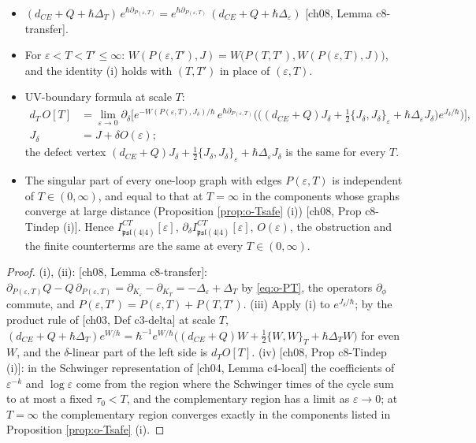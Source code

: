 \begin{lemma}
\label{lem:o-Tflow}
\begin{itemize}
\item[(i)] $(d_{CE}+Q+\hbar\Delta_T)\,e^{\hbar\partial_{P(\varepsilon,T)}}=e^{\hbar\partial_{P(\varepsilon,T)}}\,(d_{CE}+Q+\hbar\Delta_\varepsilon)$ [ch08, Lemma c8-transfer].
\item[(ii)] For $\varepsilon<T<T'\le\infty$: $W(P(\varepsilon,T'),J)=W\big(P(T,T'),W(P(\varepsilon,T),J)\big)$, and the identity (i) holds with $(T,T')$ in place of $(\varepsilon,T)$.
\item[(iii)] UV-boundary formula at scale $T$:
\[
\begin{aligned}
d_T\,O[T]&=\lim_{\varepsilon\to0}\partial_\delta\Big[e^{-W(P(\varepsilon,T),J_\delta)/\hbar}\,e^{\hbar\partial_{P(\varepsilon,T)}}\Big(\big((d_{CE}+Q)J_\delta+\tfrac12\{J_\delta,J_\delta\}_\varepsilon+\hbar\Delta_\varepsilon J_\delta\big)e^{J_\delta/\hbar}\Big)\Big],\\
J_\delta&=J+\delta O(\varepsilon);
\end{aligned}
\]
the defect vertex $(d_{CE}+Q)J_\delta+\tfrac12\{J_\delta,J_\delta\}_\varepsilon+\hbar\Delta_\varepsilon J_\delta$ is the same for every $T$.
\item[(iv)] The singular part of every one-loop graph with edges $P(\varepsilon,T)$ is independent of $T\in(0,\infty)$, and equal to that at $T=\infty$ in the components whose graphs converge at large distance (Proposition \ref{prop:o-Tsafe} (i)) [ch08, Prop c8-Tindep (i)]. Hence $I^{CT}_{\mathfrak{psl}(4|4)}[\varepsilon]$, $\partial_\delta I^{CT}_{\mathfrak{psl}(4|4)}[\varepsilon]$, $O(\varepsilon)$, the obstruction and the finite counterterms are the same at every $T\in(0,\infty)$.
\end{itemize}
\end{lemma}

\begin{proof}
(i), (ii): [ch08, Lemma c8-transfer]: $\partial_{P(\varepsilon,T)}Q-Q\,\partial_{P(\varepsilon,T)}=\partial_{K_\varepsilon}-\partial_{K_T}=-\Delta_\varepsilon+\Delta_T$ by \eqref{eq:o-PT}, the operators $\partial_\phi$ commute, and $P(\varepsilon,T')=P(\varepsilon,T)+P(T,T')$. (iii) Apply (i) to $e^{J_\delta/\hbar}$; by the product rule of [ch03, Def c3-delta] at scale $T$, $(d_{CE}+Q+\hbar\Delta_T)e^{W/\hbar}=\hbar^{-1}e^{W/\hbar}\big((d_{CE}+Q)W+\tfrac12\{W,W\}_T+\hbar\Delta_TW\big)$ for even $W$, and the $\delta$-linear part of the left side is $d_TO[T]$. (iv) [ch08, Prop c8-Tindep (i)]: in the Schwinger representation of [ch04, Lemma c4-local] the coefficients of $\varepsilon^{-k}$ and $\log\varepsilon$ come from the region where the Schwinger times of the cycle sum to at most a fixed $\tau_0<T$, and the complementary region has a limit as $\varepsilon\to0$; at $T=\infty$ the complementary region converges exactly in the components listed in Proposition \ref{prop:o-Tsafe} (i).
\end{proof}

